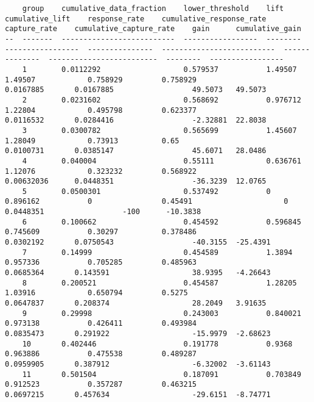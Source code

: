 \documentclass[11pt]{article}
\begin{document}
    
    \begin{verbatim}
    group    cumulative_data_fraction    lower_threshold    lift      cumulative_lift    response_rate    cumulative_response_rate    capture_rate    cumulative_capture_rate    gain      cumulative_gain
--  -------  --------------------------  -----------------  --------  -----------------  ---------------  --------------------------  --------------  -------------------------  --------  -----------------
    1        0.0112292                   0.579537           1.49507   1.49507            0.758929         0.758929                    0.0167885       0.0167885                  49.5073   49.5073
    2        0.0231602                   0.568692           0.976712  1.22804            0.495798         0.623377                    0.0116532       0.0284416                  -2.32881  22.8038
    3        0.0300782                   0.565699           1.45607   1.28049            0.73913          0.65                        0.0100731       0.0385147                  45.6071   28.0486
    4        0.040004                    0.55111            0.636761  1.12076            0.323232         0.568922                    0.00632036      0.0448351                  -36.3239  12.0765
    5        0.0500301                   0.537492           0         0.896162           0                0.45491                     0               0.0448351                  -100      -10.3838
    6        0.100662                    0.454592           0.596845  0.745609           0.30297          0.378486                    0.0302192       0.0750543                  -40.3155  -25.4391
    7        0.14999                     0.454589           1.3894    0.957336           0.705285         0.485963                    0.0685364       0.143591                   38.9395   -4.26643
    8        0.200521                    0.454587           1.28205   1.03916            0.650794         0.5275                      0.0647837       0.208374                   28.2049   3.91635
    9        0.29998                     0.243003           0.840021  0.973138           0.426411         0.493984                    0.0835473       0.291922                   -15.9979  -2.68623
    10       0.402446                    0.191778           0.9368    0.963886           0.475538         0.489287                    0.0959905       0.387912                   -6.32002  -3.61143
    11       0.501504                    0.187091           0.703849  0.912523           0.357287         0.463215                    0.0697215       0.457634                   -29.6151  -8.74771

\end{verbatim}
\end{document}
